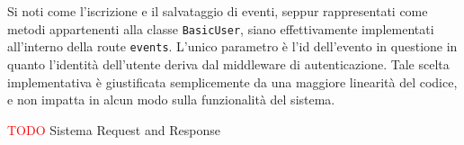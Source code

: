 \documentclass[9pt]{extarticle}
\begin{document}
Si noti come l'iscrizione e il salvataggio di eventi, seppur rappresentati come metodi appartenenti alla classe \verb*|BasicUser|, siano effettivamente implementati all'interno della route \verb*|events|. L'unico parametro è l'id dell'evento in questione in quanto l'identità dell'utente deriva dal middleware di autenticazione. Tale scelta implementativa è giustificata semplicemente da una maggiore linearità del codice, e non impatta in alcun modo sulla funzionalità del sistema.

\textcolor{red}{TODO} Sistema Request and Response
\end{document}
